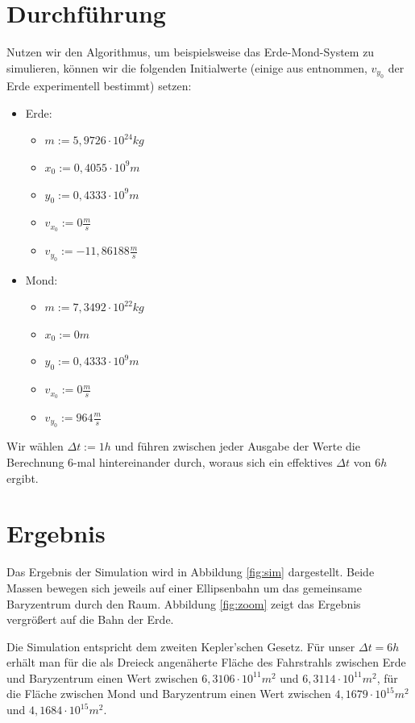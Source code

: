 \documentclass[10pt,twocolumn]{scrartcl}
\begin{document}
\section{Durchführung}
Nutzen wir den Algorithmus, um beispielsweise das Erde-Mond-System zu simulieren, können wir die folgenden Initialwerte (einige aus \cite{nasa15} entnommen, $v_{y_0}$ der Erde experimentell bestimmt) setzen:

\begin{itemize}
	\item Erde:
	\begin{itemize}
		\item $m := 5,9726 \cdot 10^{24} kg$
		\item $x_0 := 0,4055 \cdot 10^{9} m$
		\item $y_0 := 0,4333 \cdot 10^{9} m$
		\item $v_{x_0} := 0 \frac{m}{s}$
		\item $v_{y_0} := -11,86188 \frac{m}{s}$
	\end{itemize}
	\item Mond:
	\begin{itemize}
		\item $m := 7,3492 \cdot 10^{22} kg$
		\item $x_0 := 0 m$
		\item $y_0 := 0,4333 \cdot 10^{9} m$
		\item $v_{x_0} := 0 \frac{m}{s}$
		\item $v_{y_0} := 964 \frac{m}{s}$
	\end{itemize}
\end{itemize}

Wir wählen $\Delta t := 1h$ und führen zwischen jeder Ausgabe der Werte die Berechnung 6-mal hintereinander durch, woraus sich ein effektives $\Delta t$ von $6h$ ergibt.

\section{Ergebnis}
Das Ergebnis der Simulation wird in Abbildung \ref{fig:sim} dargestellt. Beide Massen bewegen sich jeweils auf einer Ellipsenbahn um das gemeinsame Baryzentrum durch den Raum. Abbildung \ref{fig:zoom} zeigt das Ergebnis vergrößert auf die Bahn der Erde.

Die Simulation entspricht dem zweiten Kepler'schen Gesetz. Für unser $\Delta t = 6 h$ erhält man für die als Dreieck angenäherte Fläche des Fahrstrahls zwischen Erde und Baryzentrum einen Wert zwischen $6,3106 \cdot 10^{11} m^2$ und $6,3114 \cdot 10^{11} m^2$, für die Fläche zwischen Mond und Baryzentrum einen Wert zwischen $4,1679 \cdot 10^{15} m^2$ und $4,1684 \cdot 10^{15} m^2$.
\end{document}
